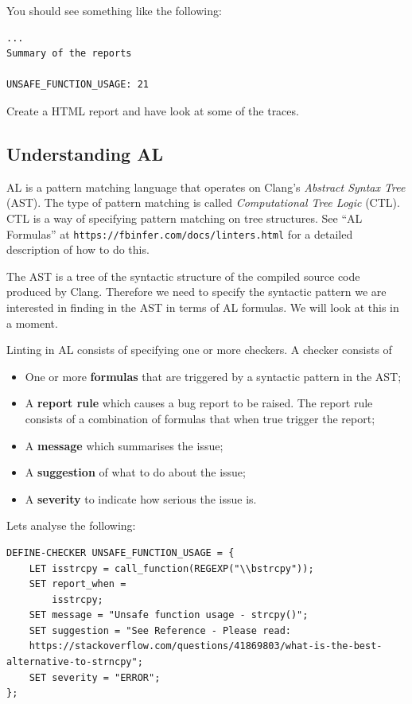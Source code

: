 You should see something like the following:

\begin{verbatim}
...
Summary of the reports

UNSAFE_FUNCTION_USAGE: 21
\end{verbatim}

Create a HTML report and have look at some of the traces.

\subsection{Understanding AL}

AL is a pattern matching language that operates on Clang's \textit{Abstract Syntax Tree} (AST).
The type of pattern matching is called \textit{Computational Tree Logic} (CTL).
CTL is a way of specifying pattern matching on tree structures. 
See ``AL Formulas'' at \verb|https://fbinfer.com/docs/linters.html| for a detailed 
description of how to do this.

The AST is a tree of the syntactic structure of the compiled source code produced by Clang.
Therefore we need to specify the syntactic pattern we are interested in finding in the AST
in terms of AL formulas. We will look at this in a moment.

Linting in AL consists of specifying one or more checkers. 
A checker consists of
\begin{itemize}
	\item One or more \textbf{formulas} that are triggered by a syntactic pattern in the AST;
	\item A \textbf{report rule} which causes a bug report to be raised. 
	The report rule consists of a combination of formulas that when true trigger the report;
	\item A \textbf{message} which summarises the issue;
	\item A \textbf{suggestion} of what to do about the issue;
	\item A \textbf{severity} to indicate how serious the issue is.
\end{itemize}

Lets analyse the following:

\begin{verbatim}
DEFINE-CHECKER UNSAFE_FUNCTION_USAGE = {
	LET isstrcpy = call_function(REGEXP("\\bstrcpy"));
	SET report_when =
		isstrcpy;
	SET message = "Unsafe function usage - strcpy()";
	SET suggestion = "See Reference - Please read:
	https://stackoverflow.com/questions/41869803/what-is-the-best-alternative-to-strncpy";
	SET severity = "ERROR";
};
\end{verbatim}


